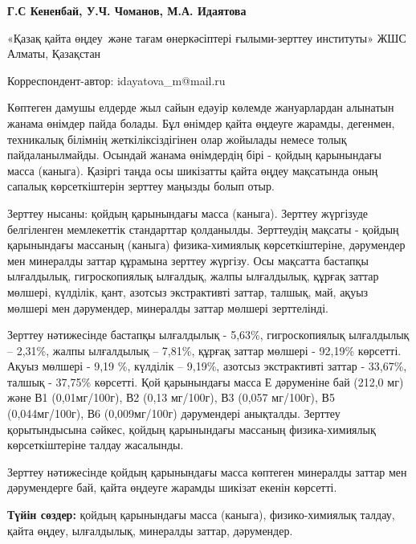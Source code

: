 
\begin{header}

{\bfseries
Г.С  Кененбай,
У.Ч. Чоманов,
М.А. Идаятова\envelope 
}
\end{header}

\begin{affil}
«Қазақ қайта өңдеу~және тағам өнеркәсіптері ғылыми-зерттеу институты» ЖШС Алматы, Қазақстан

\envelope Корреспондент-автор: idayatova\_m@mail.ru
\end{affil}

Көптеген дамушы елдерде жыл сайын едәуір көлемде жануарлардан алынатын
жанама өнімдер пайда болады. Бұл өнімдер қайта өңдеуге жарамды,
дегенмен, техникалық білімнің жеткіліксіздігінен олар жойылады немесе
толық пайдаланылмайды. Осындай жанама өнімдердің бірі - қойдың
қарынындағы масса (каныга). Қазіргі таңда осы шикізатты қайта өңдеу
мақсатында оның сапалық көрсеткіштерін зерттеу маңызды болып отыр.

Зерттеу нысаны: қойдың қарынындағы масса (каныга). Зерттеу жүргізуде
белгіленген мемлекеттік стандарттар қолданылды. Зерттеудің мақсаты -
қойдың қарынындағы массаның (каныга) физика-химиялық көрсеткіштеріне,
дәрумендер мен минералды заттар құрамына зерттеу жүргізу. Осы мақсатта
бастапқы ылғалдылық, гигроскопиялық ылғалдық, жалпы ылғалдылық, құрғақ
заттар мөлшері, күлділік, қант, азотсыз экстрактивті заттар, талшық,
май, ақуыз мөлшері мен дәрумендер, минералды заттар мөлшері зерттелінді.

Зерттеу нәтижесінде бастапқы ылғалдылық - 5,63\%, гигроскопиялық
ылғалдылық -- 2,31\%, жалпы ылғалдылық -- 7,81\%, құрғақ заттар мөлшері
- 92,19\% көрсетті. Ақуыз мөлшері - 9,19 \%, күлділік -- 9,19\%, азотсыз
экстрактивті заттар - 33,67\%, талшық - 37,75\% көрсетті. Қой
қарынындағы масса Е дәруменіне бай (212,0 мг) және В1 (0,01мг/100г), В2
(0,13 мг/100г), В3 (0,057 мг/100г), В5 (0,044мг/100г), В6 (0,009мг/100г)
дәрумендері анықталды. Зерттеу қорытындысына сәйкес, қойдың қарынындағы
массаның физика-химиялық көрсеткіштеріне талдау жасалынды.

Зерттеу нәтижесінде қойдың қарынындағы масса көптеген минералды заттар
мен дәрумендерге бай, қайта өңдеуге жарамды шикізат екенін көрсетті.

{\bfseries Түйін сөздер:} қойдың қарынындағы масса (каныга),
физико-химиялық талдау, қайта өңдеу, ыл\-ғалдылық, минералды заттар,
дәрумендер.

